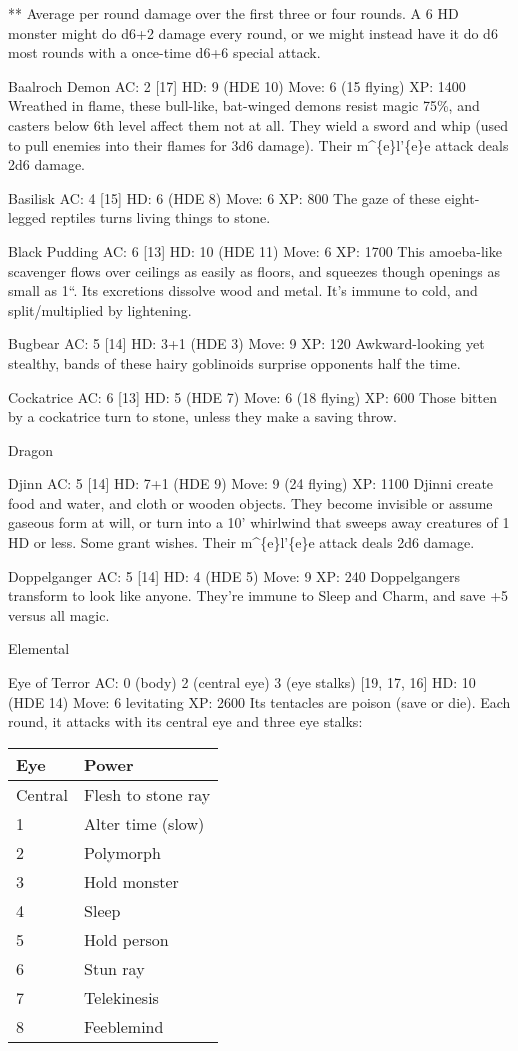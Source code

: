 ** Average per round damage over the first three or four rounds. A 6 HD
monster might do d6+2 damage every round, or we might instead have it do
d6 most rounds with a once-time d6+6 special attack.

Baalroch Demon AC: 2 {[}17{]} HD: 9 (HDE 10) Move: 6 (15 flying) XP:
1400 Wreathed in flame, these bull-like, bat-winged demons resist magic
75\%, and casters below 6th level affect them not at all. They wield a
sword and whip (used to pull enemies into their flames for 3d6 damage).
Their m\^{}\{e\}l'\{e\}e attack deals 2d6 damage.

Basilisk AC: 4 {[}15{]} HD: 6 (HDE 8) Move: 6 XP: 800 The gaze of these
eight-legged reptiles turns living things to stone.

Black Pudding AC: 6 {[}13{]} HD: 10 (HDE 11) Move: 6 XP: 1700 This
amoeba-like scavenger flows over ceilings as easily as floors, and
squeezes though openings as small as 1``. Its excretions dissolve wood
and metal. It's immune to cold, and split/multiplied by lightening.

Bugbear AC: 5 {[}14{]} HD: 3+1 (HDE 3) Move: 9 XP: 120 Awkward-looking
yet stealthy, bands of these hairy goblinoids surprise opponents half
the time.

Cockatrice AC: 6 {[}13{]} HD: 5 (HDE 7) Move: 6 (18 flying) XP: 600
Those bitten by a cockatrice turn to stone, unless they make a saving
throw.

Dragon

Djinn AC: 5 {[}14{]} HD: 7+1 (HDE 9) Move: 9 (24 flying) XP: 1100 Djinni
create food and water, and cloth or wooden objects. They become
invisible or assume gaseous form at will, or turn into a 10' whirlwind
that sweeps away creatures of 1 HD or less. Some grant wishes. Their
m\^{}\{e\}l'\{e\}e attack deals 2d6 damage.

Doppelganger AC: 5 {[}14{]} HD: 4 (HDE 5) Move: 9 XP: 240 Doppelgangers
transform to look like anyone. They're immune to Sleep and Charm, and
save +5 versus all magic.

Elemental

Eye of Terror AC: 0 (body) 2 (central eye) 3 (eye stalks) {[}19, 17,
16{]} HD: 10 (HDE 14) Move: 6 levitating XP: 2600 Its tentacles are
poison (save or die). Each round, it attacks with its central eye and
three eye stalks:

\begin{longtable}[]{@{}ll@{}}
\toprule
Eye & Power\tabularnewline
\midrule
\endhead
Central & Flesh to stone ray\tabularnewline
1 & Alter time (slow)\tabularnewline
2 & Polymorph\tabularnewline
3 & Hold monster\tabularnewline
4 & Sleep\tabularnewline
5 & Hold person\tabularnewline
6 & Stun ray\tabularnewline
7 & Telekinesis\tabularnewline
8 & Feeblemind\tabularnewline
\bottomrule
\end{longtable}

